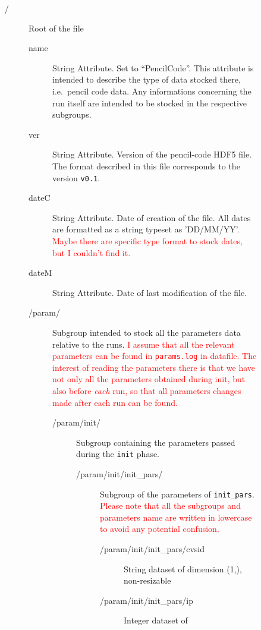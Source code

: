 \documentclass[a4paper,12pt]{article}
\newcommand{\note}[1]{\textcolor{red}{#1}}
\begin{document}
\begin{figure}[p] \centering
  \parbox{18cm}{\scriptsize %
    \begin{description}
    \item[/]  Root of the file
      \begin{description}
      \item[name] String Attribute. Set to ``PencilCode''. This attribute
        is intended to describe the type of data stocked there,
        i.e.\  pencil code data. Any informations concerning the run itself
    are intended to be stocked in the respective subgroups.
  \item[ver] String Attribute. Version of the
    pencil-code HDF5 file. The format described in this file
    corresponds to the version \texttt{v0.1}. 
  \item[dateC] String Attribute. Date of creation of the
    file. All dates are formatted as a string typeset as
      'DD/MM/YY'. \note{Maybe there are specific type format to stock dates,
      but I couldn't find it.}  
  \item[dateM] String Attribute. Date of last modification of the
    file.
  \item[/param/] Subgroup intended to stock all the parameters data
    relative to the runs. \note{I assume that all the relevant
      parameters can be found in \texttt{params.log} in datafile. The interest
      of reading the parameters there is that we have not only all the
      parameters obtained during init, but also before \emph{each} run,
      so that all parameters changes made after each run can be
      found.}
    \begin{description}
    \item[/param/init/] Subgroup containing the parameters
      passed during the \texttt{init} phase.
      \begin{description}
      \item[/param/init/init\_pars/]
        Subgroup of the parameters of
        \texttt{init\_pars}. \note{Please note that all the subgroups
          and parameters name are written in lowercase to avoid any
          potential confusion.}
        \begin{description}
          \item[/param/init/init\_pars/cvsid] String dataset of
            dimension (1,), non-resizable
          \item[/param/init/init\_pars/ip] Integer dataset of

\end{description}
\end{description}
\end{description}
\end{description}
\end{description}}
\end{figure}
\end{document}
